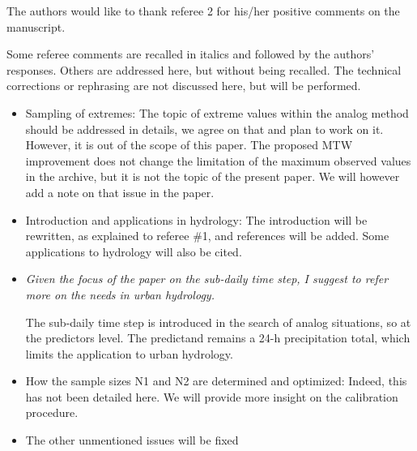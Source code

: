\documentclass[]{letter}
\begin{document}
The authors would like to thank referee 2 for his/her positive comments on the manuscript.

Some referee comments are recalled in italics and followed by the authors’ responses. Others are addressed here, but without being recalled. The technical corrections or rephrasing are not discussed here, but will be performed.

\begin{itemize}
	\item Sampling of extremes: The topic of extreme values within the analog method should be addressed in details, we agree on that and plan to work on it. However, it is out of the scope of this paper. The proposed MTW improvement does not change the limitation of the maximum observed values in the archive, but it is not the topic of the present paper. We will however add a note on that issue in the paper.
	
	\item Introduction and applications in hydrology: The introduction will be rewritten, as explained to referee \#1, and references will be added. Some applications to hydrology will also be cited.
	
	\item \textit{Given the focus of the paper on the sub-daily time step, I suggest to refer more on the needs in urban hydrology.}
	
	The sub-daily time step is introduced in the search of analog situations, so at the predictors level. The predictand remains a 24-h precipitation total, which limits the application to urban hydrology.
	
	\item How the sample sizes N1 and N2 are determined and optimized: Indeed, this has not been detailed here. We will provide more insight on the calibration procedure.
	
	\item The other unmentioned issues will be fixed
	
\end{itemize}
\end{document}
